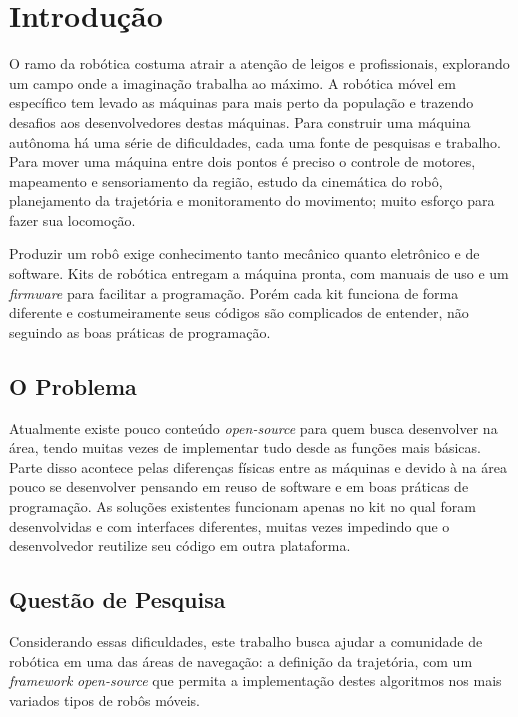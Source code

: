 \chapter[Introdução]{Introdução}

O ramo da robótica costuma atrair a atenção de leigos e profissionais, explorando um campo onde a imaginação trabalha ao máximo. A robótica móvel em específico tem levado as máquinas para mais perto da população e trazendo desafios aos desenvolvedores destas máquinas. Para construir uma máquina autônoma há uma série de dificuldades, cada uma fonte de pesquisas e trabalho. Para mover uma máquina entre dois pontos é preciso o controle de motores, mapeamento e sensoriamento da região, estudo da cinemática do robô, planejamento da trajetória e monitoramento do movimento; muito esforço para fazer sua locomoção.

Produzir um robô exige conhecimento tanto mecânico quanto eletrônico e de software. Kits de robótica entregam a máquina pronta, com manuais de uso e um \textit{firmware} para facilitar a programação. Porém cada kit funciona de forma diferente e costumeiramente seus códigos são complicados de entender, não seguindo as boas práticas de programação.

\section{O Problema}

Atualmente existe pouco conteúdo \textit{open-source} para quem busca desenvolver na área, tendo muitas vezes de implementar tudo desde as funções mais básicas. Parte disso acontece pelas diferenças físicas entre as máquinas e devido à na área pouco se desenvolver pensando em reuso de software e em boas práticas de programação. As soluções existentes funcionam apenas no kit no qual foram desenvolvidas e com interfaces diferentes, muitas vezes impedindo que o desenvolvedor reutilize seu código em outra plataforma.

\section{Questão de Pesquisa}

Considerando essas dificuldades, este trabalho busca ajudar a comunidade de robótica em uma das áreas de navegação: a definição da trajetória, com um \textit{framework} \textit{open-source} que permita a implementação destes algoritmos nos mais variados tipos de robôs móveis.

